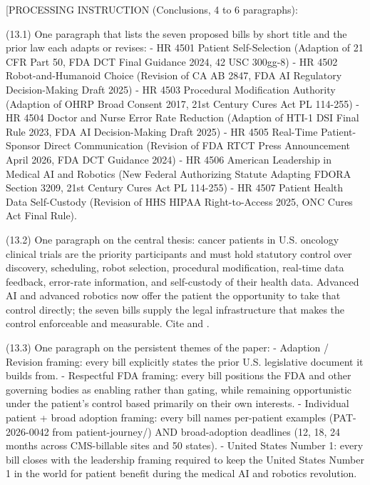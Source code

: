 
[PROCESSING INSTRUCTION (Conclusions, 4 to 6 paragraphs):

(13.1) One paragraph that lists the seven proposed bills by short
title and the prior law each adapts or revises:
- HR 4501 Patient Self-Selection (Adaption of 21 CFR Part 50, FDA
  DCT Final Guidance 2024, 42 USC 300gg-8)
- HR 4502 Robot-and-Humanoid Choice (Revision of CA AB 2847, FDA AI
  Regulatory Decision-Making Draft 2025)
- HR 4503 Procedural Modification Authority (Adaption of OHRP Broad
  Consent 2017, 21st Century Cures Act PL 114-255)
- HR 4504 Doctor and Nurse Error Rate Reduction (Adaption of HTI-1
  DSI Final Rule 2023, FDA AI Decision-Making Draft 2025)
- HR 4505 Real-Time Patient-Sponsor Direct Communication (Revision
  of FDA RTCT Press Announcement April 2026, FDA DCT Guidance 2024)
- HR 4506 American Leadership in Medical AI and Robotics (New
  Federal Authorizing Statute Adapting FDORA Section 3209, 21st
  Century Cures Act PL 114-255)
- HR 4507 Patient Health Data Self-Custody (Revision of HHS HIPAA
  Right-to-Access 2025, ONC Cures Act Final Rule).

(13.2) One paragraph on the central thesis: cancer patients in U.S.
oncology clinical trials are the priority participants and must hold
statutory control over discovery, scheduling, robot selection,
procedural modification, real-time data feedback, error-rate
information, and self-custody of their health data. Advanced AI and
advanced robotics now offer the patient the opportunity to take that
control directly; the seven bills supply the legal infrastructure
that makes the control enforceable and measurable. Cite
\cite{kawchak_2026_19994945} and \cite{kawchak_2026_19119939}.

(13.3) One paragraph on the persistent themes of the paper:
- Adaption / Revision framing: every bill explicitly states the
  prior U.S. legislative document it builds from.
- Respectful FDA framing: every bill positions the FDA and other
  governing bodies as enabling rather than gating, while remaining
  opportunistic under the patient's control based primarily on
  their own interests.
- Individual patient + broad adoption framing: every bill names
  per-patient examples (PAT-2026-0042 from patient-journey/) AND
  broad-adoption deadlines (12, 18, 24 months across CMS-billable
  sites and 50 states).
- United States Number 1: every bill closes with the leadership
  framing required to keep the United States Number 1 in the world
  for patient benefit during the medical AI and robotics revolution.

